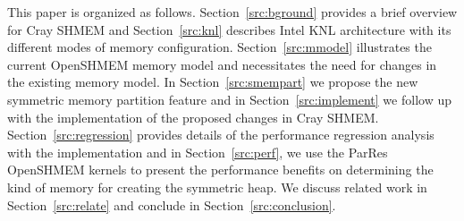 This paper is organized as follows.
Section~\ref{src:bground} provides a brief overview for Cray SHMEM
and Section~\ref{src:knl} describes Intel KNL architecture with its
different modes of memory configuration. Section~\ref{src:mmodel}
illustrates the current OpenSHMEM memory model and necessitates the need
for changes in the existing memory model. In Section~\ref{src:smempart}
we propose the new symmetric memory partition feature and in
Section~\ref{src:implement} we follow up with
the implementation of the proposed changes in Cray SHMEM.
Section~\ref{src:regression} provides details of the performance
regression analysis with the implementation and in
Section~\ref{src:perf}, we use the ParRes OpenSHMEM kernels to present the performance benefits on
determining the kind of memory for creating the symmetric heap. We
discuss related work in Section~\ref{src:relate} and conclude in
Section~\ref{src:conclusion}.
